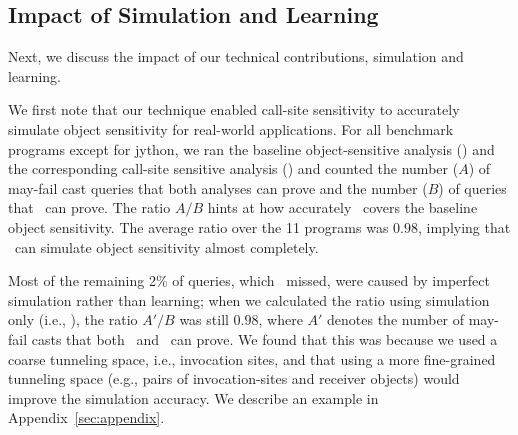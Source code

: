 

\subsection{Impact of Simulation and Learning}\label{sec:eval_learning}


Next, we discuss the impact of our technical contributions, simulation and learning. 

We first note that our technique enabled call-site
sensitivity to accurately simulate object sensitivity for real-world
applications.
For all benchmark programs except for jython, we ran the
baseline object-sensitive analysis (\oneobjHT) and the corresponding
call-site sensitive analysis (\ours) and counted the number ($A$) of may-fail cast
queries that both analyses can prove and the number ($B$) of queries
that \oneobjHT~can prove. The ratio $A/B$ hints at how accurately
\ours~covers the baseline object sensitivity. The
average ratio over the 11 programs was $0.98$, implying that \ourtechnique~can simulate object sensitivity almost completely.

Most of the remaining 2\% of queries, which \ourtechnique~missed, were caused by imperfect simulation rather than learning; 
when we calculated the ratio using simulation only (i.e., \oursim), 
the ratio $A'/B$ was still $0.98$, where $A'$ denotes the number of may-fail casts that both \oursim~and \oneobjHT~can prove. 
We found that this was because we used a coarse tunneling space, i.e., invocation sites, and that 
using a more fine-grained tunneling space (e.g., pairs of invocation-sites and receiver objects) would improve the simulation accuracy. 
We describe an example in Appendix~\ref{sec:appendix}. 



